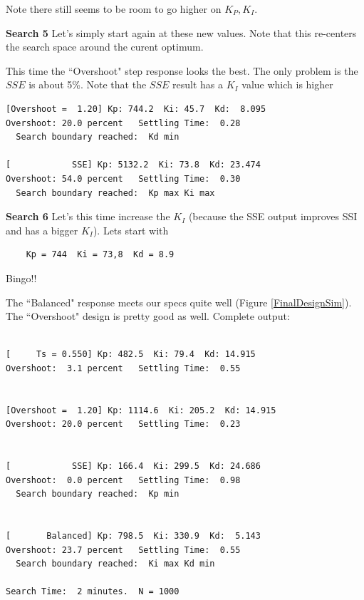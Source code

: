 Note there still seems to be room to go higher on $K_P, K_I$.

{\bf Search 5}   Let's simply start again at these new values.  Note that this re-centers the search space around the curent optimum.

This time the ``Overshoot" step response looks the best.  The only problem is the $SSE$ is about 5\%.  Note that the $SSE$ result has a $K_I$ value which is higher


\begin{verbatim}
[Overshoot =  1.20] Kp: 744.2  Ki: 45.7  Kd:  8.095
Overshoot: 20.0 percent   Settling Time:  0.28
  Search boundary reached:  Kd min

[            SSE] Kp: 5132.2  Ki: 73.8  Kd: 23.474
Overshoot: 54.0 percent   Settling Time:  0.30
  Search boundary reached:  Kp max Ki max
\end{verbatim}


{\bf Search 6}  Let's this time increase the $K_I$ (because the SSE output improves SSI and has a bigger $K_I$).   Lets start with
\begin{verbatim}
    Kp = 744  Ki = 73,8  Kd = 8.9
\end{verbatim}

Bingo!!

The ``Balanced" response meets our specs quite well (Figure \ref{FinalDesignSim}).   The ``Overshoot" design is pretty good as well.
Complete output:

\begin{verbatim}

[     Ts = 0.550] Kp: 482.5  Ki: 79.4  Kd: 14.915
Overshoot:  3.1 percent   Settling Time:  0.55


[Overshoot =  1.20] Kp: 1114.6  Ki: 205.2  Kd: 14.915
Overshoot: 20.0 percent   Settling Time:  0.23


[            SSE] Kp: 166.4  Ki: 299.5  Kd: 24.686
Overshoot:  0.0 percent   Settling Time:  0.98
  Search boundary reached:  Kp min


[       Balanced] Kp: 798.5  Ki: 330.9  Kd:  5.143
Overshoot: 23.7 percent   Settling Time:  0.55
  Search boundary reached:  Ki max Kd min

Search Time:  2 minutes.  N = 1000

\end{verbatim}


